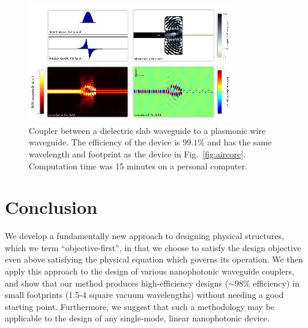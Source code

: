 \documentclass[letterpaper,10pt]{article}
\begin{document}
\clearpage
\begin{figure}[htb]
    \centering
    \includegraphics[width=0.8\textwidth]{5}
    \caption{Coupler between a dielectric slab waveguide to 
            a plasmonic wire waveguide.
        The efficiency of the device is $99.1\%$ and 
            has the same wavelength and footprint as the device in
            Fig.~\ref{fig:aircore}.
        Computation time was 15 minutes on a personal computer.
        }
        \label{fig:wire}
\end{figure}

\section{Conclusion}
We develop a fundamentally new approach to designing physical structures,
    which we term ``objective-first'', 
    in that we choose to satisfy the design objective 
    even above satisfying the physical equation which governs its operation.
We then apply this approach to the design of 
    various nanophotonic waveguide couplers,
    and show that our method produces
    high-efficiency designs ($\sim 98\%$ efficiency) 
    in small footprints (1.5-4 square vacuum wavelengths)
    without needing a good starting point.
Furthermore, we suggest that such a methodology may be applicable
    to the design of any single-mode, linear nanophotonic device.\\
\end{document}
